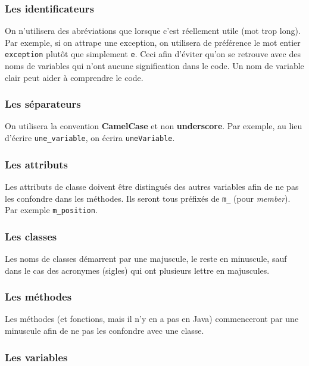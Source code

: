 \documentclass[11pt]{report}
\begin{document}
\subsubsection{Les identificateurs}

On n'utilisera des abréviations que lorsque c'est réellement utile (mot trop long). Par exemple, si on attrape une exception, on utilisera de préférence le mot entier \verb|exception| plutôt que simplement \verb|e|. Ceci afin d'éviter qu'on se retrouve avec des noms de variables qui n'ont aucune signification dans le code. Un nom de variable clair peut aider à comprendre le code.

\subsubsection{Les séparateurs}

On utilisera la convention \textbf{CamelCase} et non \textbf{underscore}. Par exemple, au lieu d'écrire \verb|une_variable|, on écrira \verb|uneVariable|.

\subsubsection{Les attributs}

Les attributs de classe doivent être distingués des autres variables afin de ne pas les confondre dans les méthodes. Ils seront tous préfixés de \verb|m_| (pour \textit{member}). Par exemple \verb|m_position|.

\subsubsection{Les classes}

Les noms de classes démarrent par une majuscule, le reste en minuscule, sauf dans le cas des acronymes (sigles) qui ont plusieurs lettre en majuscules.

\subsubsection{Les méthodes}

Les méthodes (et fonctions, mais il n'y en a pas en Java) commenceront par une minuscule afin de ne pas les confondre avec une classe.

\subsubsection{Les variables}
\end{document}
